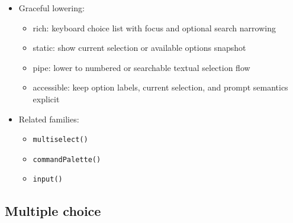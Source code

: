 \begin{itemize}
  \begin{itemize}
  \tightlist
  \item
    core
  \end{itemize}
\item
  Graceful lowering:

  \begin{itemize}
  \tightlist
  \item
    rich: keyboard choice list with focus and optional search narrowing
  \item
    static: show current selection or available options snapshot
  \item
    pipe: lower to numbered or searchable textual selection flow
  \item
    accessible: keep option labels, current selection, and prompt semantics explicit
  \end{itemize}
\item
  Related families:

  \begin{itemize}
  \tightlist
  \item
    \texttt{m\allowbreak{}u\allowbreak{}l\allowbreak{}t\allowbreak{}i\allowbreak{}s\allowbreak{}e\allowbreak{}l\allowbreak{}e\allowbreak{}c\allowbreak{}t\allowbreak{}(\allowbreak{})}
  \item
    \texttt{c\allowbreak{}o\allowbreak{}m\allowbreak{}m\allowbreak{}a\allowbreak{}n\allowbreak{}d\allowbreak{}P\allowbreak{}a\allowbreak{}l\allowbreak{}e\allowbreak{}t\allowbreak{}t\allowbreak{}e\allowbreak{}(\allowbreak{})}
  \item
    \texttt{i\allowbreak{}n\allowbreak{}p\allowbreak{}u\allowbreak{}t\allowbreak{}(\allowbreak{})}
  \end{itemize}
\end{itemize}

\subsection{Multiple choice}\label{record-019-multiple-choice}

